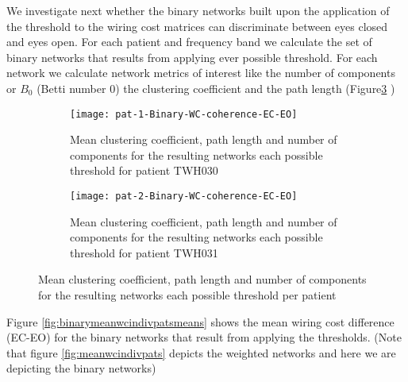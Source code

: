 \documentclass[11pt, onecolumn]{article}
\begin{document}
We investigate next whether the binary networks built upon the application of the threshold to the wiring cost matrices can discriminate between eyes closed and eyes open. For each patient and frequency band we calculate the set of binary networks that results from applying ever possible threshold. For each network we calculate network metrics of interest like the number of components or $B_0$ (Betti number 0) the clustering coefficient and the path length (Figure\ref{fig:binarymeanwcindivpats} )

\begin{figure}[ht] 
  \begin{subfigure}[t]{0.5\linewidth}
    \centering
    \texttt{[image: pat-1-Binary-WC-coherence-EC-EO]} 
    \caption{Mean clustering coefficient, path length and number of components for the resulting networks each possible threshold for patient TWH030} 
    \label{fig0:a} 
    \vspace{4ex}
  \end{subfigure}%
  \hspace{1ex}
  \begin{subfigure}[t]{0.5\linewidth}
    \centering
    \texttt{[image: pat-2-Binary-WC-coherence-EC-EO]} 
    \caption{Mean clustering coefficient, path length and number of components for the resulting networks each possible threshold for patient TWH031}
    \label{fig0:b} 
    \vspace{4ex}
  \end{subfigure} 
  \caption{Mean clustering coefficient, path length and number of components for the resulting networks each possible threshold per patient}
  \label{fig:binarymeanwcindivpats} 
\end{figure}



Figure \ref{fig:binarymeanwcindivpatsmeans} shows the mean wiring cost difference (EC-EO) for the binary networks that result from applying the thresholds. (Note that figure \ref{fig:meanwcindivpats} depicts the weighted networks and here we are depicting the binary networks)
\end{document}
